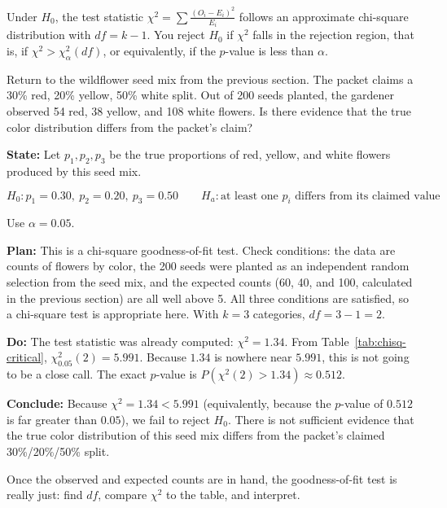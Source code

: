 Under $H_0$, the test statistic $\chi^2 = \sum \frac{(O_i - E_i)^2}{E_i}$ follows an approximate chi-square distribution with $df = k - 1$. You reject $H_0$ if $\chi^2$ falls in the rejection region, that is, if $\chi^2 > \chi^2_\alpha(df)$, or equivalently, if the $p$-value is less than $\alpha$.

\begin{Worked}
\begin{Problem}
Return to the wildflower seed mix from the previous section. The packet claims a 30\% red, 20\% yellow, 50\% white split. Out of 200 seeds planted, the gardener observed 54 red, 38 yellow, and 108 white flowers. Is there evidence that the true color distribution differs from the packet's claim?
\end{Problem}
\begin{Solution}
\textbf{State:} Let $p_1, p_2, p_3$ be the true proportions of red, yellow, and white flowers produced by this seed mix.

\[
H_0: p_1 = 0.30, \ p_2 = 0.20, \ p_3 = 0.50 \qquad H_a: \text{at least one } p_i \text{ differs from its claimed value}
\]

Use $\alpha = 0.05$.

\textbf{Plan:} This is a chi-square goodness-of-fit test. Check conditions: the data are counts of flowers by color, the 200 seeds were planted as an independent random selection from the seed mix, and the expected counts (60, 40, and 100, calculated in the previous section) are all well above 5. All three conditions are satisfied, so a chi-square test is appropriate here. With $k = 3$ categories, $df = 3 - 1 = 2$.

\textbf{Do:} The test statistic was already computed: $\chi^2 = 1.34$. From Table~\ref{tab:chisq-critical}, $\chi^2_{0.05}(2) = 5.991$. Because $1.34$ is nowhere near $5.991$, this is not going to be a close call. The exact $p$-value is $P(\chi^2(2) > 1.34) \approx 0.512$.

\textbf{Conclude:} Because $\chi^2 = 1.34 < 5.991$ (equivalently, because the $p$-value of $0.512$ is far greater than $0.05$), we fail to reject $H_0$. There is not sufficient evidence that the true color distribution of this seed mix differs from the packet's claimed 30\%/20\%/50\% split.
\end{Solution}
\end{Worked}

Once the observed and expected counts are in hand, the goodness-of-fit test is really just: find $df$, compare $\chi^2$ to the table, and interpret. 

